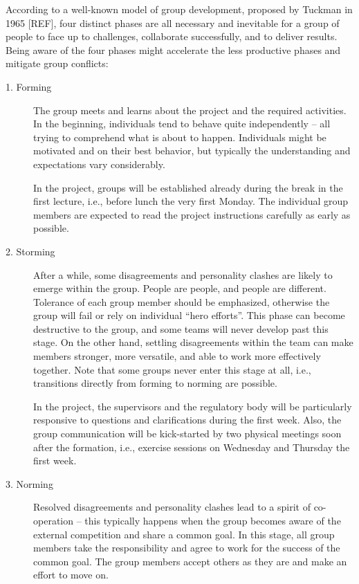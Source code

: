 \documentclass{scrreprt}
\begin{document}
According to a well-known model of group development, proposed by Tuckman in 1965 [REF], four distinct phases are all necessary and inevitable for a group of people to face up to challenges, collaborate successfully, and to  deliver results. Being aware of the four phases might accelerate the less productive phases and mitigate group conflicts:
\begin{description}
\item[1. Forming] The group meets and learns about the project and the required activities. In the beginning, individuals tend to behave quite independently -- all trying to comprehend what is about to happen. Individuals might be motivated and on their best behavior, but typically the understanding and expectations vary considerably. 

In the project, groups will be established already during the break in the first lecture, i.e., before lunch the very first Monday. The individual group members are expected to read the project instructions carefully as early as possible.
\item[2. Storming] After a while, some disagreements and personality clashes are likely to emerge within the group. People are people, and people are different. Tolerance of each group member should be emphasized, otherwise the group will fail or rely on individual ``hero efforts''. This phase can become destructive to the group, and some teams will never develop past this stage. On the other hand, settling disagreements within the team can make members stronger, more versatile, and able to work more effectively together. Note that some groups never enter this stage at all, i.e., transitions directly from forming to norming are possible.

In the project, the supervisors and the regulatory body will be particularly responsive to questions and clarifications during the first week. Also, the group communication will be kick-started by two physical meetings soon after the formation, i.e., exercise sessions on Wednesday and Thursday the first week.

\item[3. Norming] Resolved disagreements and personality clashes lead to a spirit of co-operation -- this typically happens when the group becomes aware of the external competition and share a common goal. In this stage, all group members take the responsibility and agree to work for the success of the common goal. The group members accept others as they are and make an effort to move on. 


\end{description}
\end{document}
